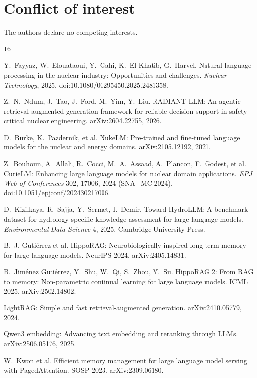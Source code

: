 \documentclass[sigconf,nonacm]{acmart}
\begin{document}
\section*{Conflict of interest}

The authors declare no competing interests.

\begin{thebibliography}{16}

 Y.~Fayyaz, W.~Elouataoui, Y.~Gahi, K.~El-Khatib,
G.~Harvel. Natural language processing in the nuclear industry:
Opportunities and challenges.
\emph{Nuclear Technology}, 2025. doi:10.1080/00295450.2025.2481358.

 Z.~N.~Ndum, J.~Tao, J.~Ford, M.~Yim, Y.~Liu.
RADIANT-LLM: An agentic retrieval augmented generation framework for
reliable decision support in safety-critical nuclear engineering.
arXiv:2604.22755, 2026.

 D.~Burke, K.~Pazdernik, et al. NukeLM: Pre-trained and
fine-tuned language models for the nuclear and energy domains.
arXiv:2105.12192, 2021.

 Z.~Bouhoun, A.~Allali, R.~Cocci, M.~A.~Assaad,
A.~Plancon, F.~Godest, et al. CurieLM: Enhancing large language models
for nuclear domain applications. \emph{EPJ Web of Conferences} 302,
17006, 2024 (SNA+MC 2024). doi:10.1051/epjconf/202430217006.

 D.~Kizilkaya, R.~Sajja, Y.~Sermet, I.~Demir. Toward
HydroLLM: A benchmark dataset for hydrology-specific knowledge assessment
for large language models. \emph{Environmental Data Science} 4, 2025.
Cambridge University Press.

 B.~J. Guti\'errez et al. HippoRAG: Neurobiologically
inspired long-term memory for large language models. NeurIPS 2024.
arXiv:2405.14831.

 B.~Jim\'enez Guti\'errez, Y.~Shu, W.~Qi, S.~Zhou,
Y.~Su. HippoRAG 2: From RAG to memory: Non-parametric
continual learning for large language models. ICML 2025. arXiv:2502.14802.

 LightRAG: Simple and fast retrieval-augmented generation.
arXiv:2410.05779, 2024.

 Qwen3 embedding: Advancing text embedding and reranking
through LLMs. arXiv:2506.05176, 2025.

 W.~Kwon et al. Efficient memory management for large language
model serving with PagedAttention. SOSP 2023. arXiv:2309.06180.


\end{thebibliography}
\end{document}
